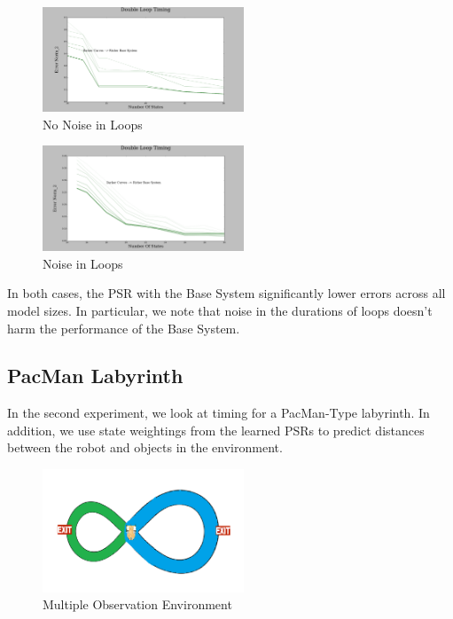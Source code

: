\documentclass{acm_proc_article-sp}
\begin{document}
\begin{figure}[ht!]
\centering
\includegraphics[width=60mm]{lucasplots/monImages/DoubleLoopTiming0.png}
\caption{No Noise in Loops \label{overflow}}
\end{figure}

\begin{figure}[ht!]
\centering
\includegraphics[width=60mm]{lucasplots/monImages/DoubleLoopTiming0_1.png}
\caption{Noise in Loops \label{overflow}}
\end{figure}

In both cases, the PSR with the Base System significantly lower errors across all model sizes. In particular, we note that noise in the durations of loops doesn't harm the performance of the Base System.

\subsection{PacMan Labyrinth}

In the second experiment, we look at timing for a PacMan-Type labyrinth. In addition, we use state weightings from the learned PSRs to predict distances between the robot and objects in the environment. 

\begin{figure}[ht!]
\centering
\includegraphics[width=60mm]{lucasplots/monImages/doubleLoopImageMO.png}
\caption{Multiple Observation Environment \label{overflow}}
\end{figure}
\end{document}

